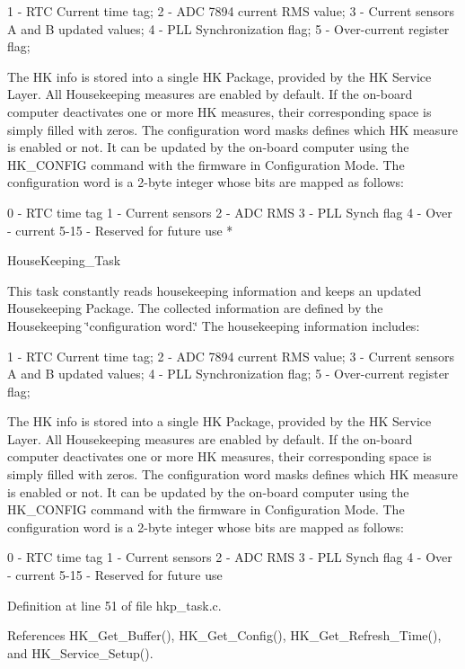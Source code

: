 1 -\/ R\+TC Current time tag; 2 -\/ A\+DC 7894 current R\+MS value; 3 -\/ Current sensors A and B updated values; 4 -\/ P\+LL Synchronization flag; 5 -\/ Over-\/current register flag;

The HK info is stored into a single HK Package, provided by the HK Service Layer. All Housekeeping measures are enabled by default. If the on-\/board computer deactivates one or more HK measures, their corresponding space is simply filled with zeros. The configuration word masks defines which HK measure is enabled or not. It can be updated by the on-\/board computer using the H\+K\+\_\+\+C\+O\+N\+F\+IG command with the firmware in Configuration Mode. The configuration word is a 2-\/byte integer whose bits are mapped as follows\+:


\begin{DoxyPre}
    0   - RTC time tag
    1   - Current sensors
    2   - ADC RMS
    3   - PLL Synch flag
    4   - Over - current
    5-15 - Reserved for future use
*\end{DoxyPre}


House\+Keeping\+\_\+\+Task

This task constantly reads housekeeping information and keeps an updated Housekeeping Package. The collected information are defined by the Housekeeping \char`\"{}configuration
word.\char`\"{} The housekeeping information includes\+:

1 -\/ R\+TC Current time tag; 2 -\/ A\+DC 7894 current R\+MS value; 3 -\/ Current sensors A and B updated values; 4 -\/ P\+LL Synchronization flag; 5 -\/ Over-\/current register flag;

The HK info is stored into a single HK Package, provided by the HK Service Layer. All Housekeeping measures are enabled by default. If the on-\/board computer deactivates one or more HK measures, their corresponding space is simply filled with zeros. The configuration word masks defines which HK measure is enabled or not. It can be updated by the on-\/board computer using the H\+K\+\_\+\+C\+O\+N\+F\+IG command with the firmware in Configuration Mode. The configuration word is a 2-\/byte integer whose bits are mapped as follows\+:

0 -\/ R\+TC time tag 1 -\/ Current sensors 2 -\/ A\+DC R\+MS 3 -\/ P\+LL Synch flag 4 -\/ Over -\/ current 5-\/15 -\/ Reserved for future use 

Definition at line 51 of file hkp\+\_\+task.\+c.



References H\+K\+\_\+\+Get\+\_\+\+Buffer(), H\+K\+\_\+\+Get\+\_\+\+Config(), H\+K\+\_\+\+Get\+\_\+\+Refresh\+\_\+\+Time(), and H\+K\+\_\+\+Service\+\_\+\+Setup().



